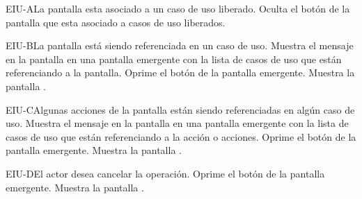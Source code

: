 	\begin{UCtrayectoriaA}{EIU-A}{La pantalla esta asociado a un caso de uso liberado.}
		\UCpaso[\UCsist] Oculta el botón \eliminar de la pantalla que esta asociado a casos de uso liberados.
	\end{UCtrayectoriaA}

	\begin{UCtrayectoriaA}{EIU-B}{La pantalla está siendo referenciada en un caso de uso.}
		\UCpaso[\UCsist] Muestra el mensaje  en la pantalla  en una pantalla emergente con la lista de casos de uso que están referenciando a la pantalla.
		\UCpaso[\UCactor] Oprime el botón  de la pantalla emergente.
		\UCpaso[\UCsist] Muestra la pantalla .
	\end{UCtrayectoriaA}

	\begin{UCtrayectoriaA}{EIU-C}{Algunas acciones de la pantalla están siendo referenciadas en algún caso de uso.}
		\UCpaso[\UCsist] Muestra el mensaje  en la pantalla  en una pantalla emergente con la lista de casos de uso que están referenciando a la acción o acciones.
		\UCpaso[\UCactor] Oprime el botón  de la pantalla emergente.
		\UCpaso[\UCsist] Muestra la pantalla .
	\end{UCtrayectoriaA}

	\begin{UCtrayectoriaA}{EIU-D}{El actor desea cancelar la operación.}
		\UCpaso[\UCactor] Oprime el botón  de la pantalla emergente.
		\UCpaso[\UCsist] Muestra la pantalla .
	\end{UCtrayectoriaA}
	

